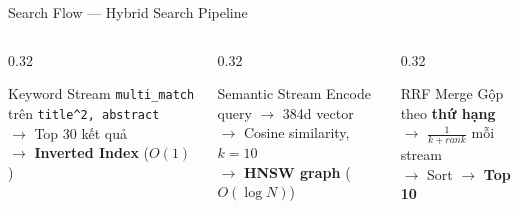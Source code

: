 \begin{frame}{Search Flow --- Hybrid Search Pipeline}
\vspace{0.2cm}

\begin{columns}[T]
\begin{column}{0.32\textwidth}
\begin{block}{\small\textcolor{accentBlue}{Keyword Stream}}
{\scriptsize
\texttt{multi\_match} trên \texttt{title\^{}2, abstract}\\
$\to$ Top 30 kết quả\\
$\to$ \textbf{Inverted Index} ($O(1)$)
}
\end{block}
\end{column}
\begin{column}{0.32\textwidth}
\begin{block}{\small\textcolor{accentOrange}{Semantic Stream}}
{\scriptsize
Encode query $\to$ 384d vector\\
$\to$ Cosine similarity, $k=10$\\
$\to$ \textbf{HNSW graph} ($O(\log N)$)
}
\end{block}
\end{column}
\begin{column}{0.32\textwidth}
\begin{exampleblock}{\small\textcolor{accentTeal}{RRF Merge}}
{\scriptsize
Gộp theo \textbf{thứ hạng}\\
$\to$ $\frac{1}{k+rank}$ mỗi stream\\
$\to$ Sort $\to$ \textbf{Top 10}
}
\end{exampleblock}
\end{column}
\end{columns}
\end{frame}
